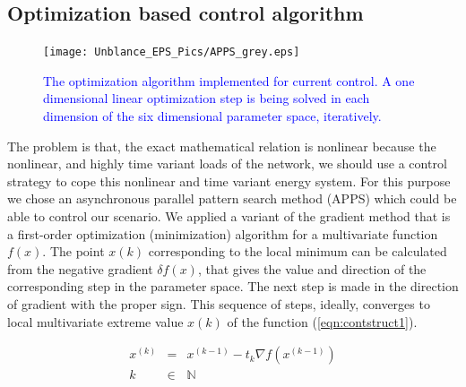     \subsection{Optimization based control algorithm}

        \begin{figure}[ht]
        \centering
        \texttt{[image: Unblance\_EPS\_Pics/APPS\_grey.eps]}
        \caption{\textcolor{blue}{The optimization algorithm implemented for current control. A one dimensional linear optimization step is being solved in each dimension of the six dimensional parameter space, iteratively.}}
        \label{fig:APPS}
        \end{figure}

        The problem is that, the exact mathematical relation is nonlinear because the nonlinear, and highly time variant loads of the network, we should use a control strategy to cope this nonlinear and time variant energy system. For this purpose we chose an asynchronous parallel pattern search method (APPS) which could be able to control our scenario.  We applied a variant of the gradient method that is a first-order optimization (minimization) algorithm for a multivariate function $f(x)$. The point $x(k)$ corresponding to the local minimum can be calculated from the negative gradient $\delta f(x)$, that gives the value and direction of the corresponding step in the parameter space. The next step is made in the direction of gradient with the proper sign. This sequence of steps, ideally, converges to local multivariate extreme value $x(k)$ of the function (\ref{eqn:contstruct1}).

        \begin{equation}
        \begin{array}{rcl}
        \label{eqn:contstruct1}
         x^{(k)}&=&x^{(k-1)}-t_k \nabla f(x^{(k-1)})\\
         k&\in&\mathbb{N}\\
         \end{array}
        \end{equation}

